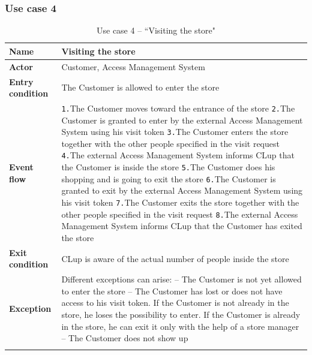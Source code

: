 \documentclass[a4paper,oneside,11pt]{book}   %
\begin{document}
    \subsubsection{Use case 4}
    \begin{longtable}[c] { |>{\bfseries{}}C{0.25\textwidth}|H{0.55\textwidth}| }
        \hline
        Name            & Visiting the store \\ \hline
        Actor           & Customer, Access Management System \\ \hline
        Entry condition & The Customer is allowed to enter the store  \\ \hline
        Event flow      & 
        \texttt{1.}The Customer moves toward the entrance of the store \newline
        \texttt{2.}The Customer is granted to enter by the external Access Management System using his visit token \newline
        \texttt{3.}The Customer enters the store together with the other people specified in the visit request \newline
        \texttt{4.}The external Access Management System informs CLup that the Customer is inside the store \newline
        \texttt{5.}The Customer does his shopping and is going to exit the store \newline
        \texttt{6.}The Customer is granted to exit by the external Access Management System using his visit token \newline
        \texttt{7.}The Customer exits the store together with the other people specified in the visit request \newline
        \texttt{8.}The external Access Management System informs CLup that the Customer has exited the store
        \\ \hline
        Exit condition  & CLup is aware of the actual number of people inside the store \\ \hline
        Exception       & Different exceptions can arise: \newline
        -- The Customer is not yet allowed to enter the store \newline
        -- The Customer has lost or does not have access to his visit token. If the Customer is not already in the store, he loses the possibility to enter. If the Customer is already in the store, he can exit it only with the help of a store manager \newline
        -- The Customer does not show up \\
        \hline
    \caption{Use case 4 -- ``Visiting the store"}
    \label{table:use_case_04}
    \end{longtable}
    
\end{document}
